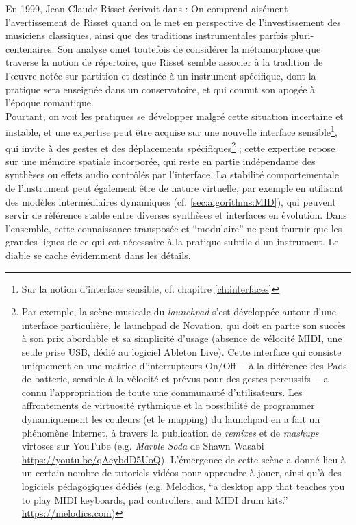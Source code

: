 \indent En 1999, Jean-Claude Risset écrivait dans \cite{genevois_les_1999} :  On comprend aisément l'avertissement de Risset quand on le met en perspective de l'investissement des musiciens classiques, ainsi que des traditions instrumentales parfois pluri-centenaires. Son analyse omet toutefois de considérer la métamorphose que traverse la notion de répertoire, que Risset semble associer à la tradition de l'œuvre notée sur partition et destinée à un instrument spécifique, dont la pratique sera enseignée dans un conservatoire, et qui connut son apogée à l'époque romantique.\\
\noindent Pourtant, on voit les pratiques se développer malgré cette situation incertaine et instable, et une expertise peut être acquise sur une nouvelle interface sensible\footnote{Sur la notion d'interface sensible, cf. chapitre \ref{ch:interfaces}}, qui invite à des gestes et des déplacements spécifiques\footnote{Par exemple, la scène musicale du \textit{launchpad} s'est développée autour d'une interface particulière, le launchpad de Novation, qui doit en partie son succès à son prix abordable et sa simplicité d'usage (absence de vélocité \gls{MIDI}, une seule prise \gls{USB}, dédié au logiciel Ableton Live). Cette interface qui consiste uniquement en une matrice d'interrupteurs On/Off --~à la différence des Pads de batterie, sensible à la vélocité et prévus pour des gestes percussifs~-- a connu l'appropriation de toute une communauté d'utilisateurs. Les affrontements de virtuosité rythmique et la possibilité de programmer dynamiquement les couleurs (et le mapping) du launchpad en a fait un phénomène Internet, à travers la publication de \textit{remixes} et de \textit{mashups} virtoses sur YouTube (e.g. \textit{Marble Soda} de Shawn Wasabi \url{https://youtu.be/qAeybdD5UoQ}). L'émergence de cette scène a donné lieu à un certain nombre de tutoriels vidéos pour apprendre à jouer, ainsi qu'à des logiciels pédagogiques dédiés (e.g. Melodics, ``a desktop app that teaches you to play MIDI keyboards, pad controllers, and MIDI drum kits.'' \url{https://melodics.com})} ; cette expertise repose sur une mémoire spatiale incorporée, qui reste en partie indépendante des synthèses ou effets audio contrôlés par l'interface. La stabilité comportementale de l'instrument peut également être de nature virtuelle, par exemple en utilisant des modèles intermédiaires dynamiques \cite{goudard_dynamic_2011} (cf. \ref{sec:algorithms:MID}), qui peuvent servir de référence stable entre diverses synthèses et interfaces en évolution.
\noindent Dans l'ensemble, cette connaissance transposée et ``modulaire'' ne peut fournir que les grandes lignes de ce qui est nécessaire à la pratique subtile d'un instrument. Le diable se cache évidemment dans les détails.


